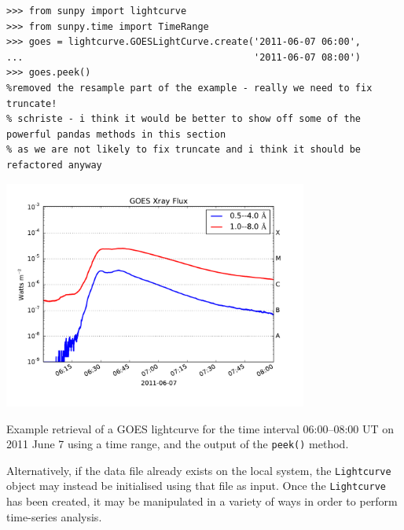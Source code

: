 \begin{listing}[H]
\begin{verbatim}
>>> from sunpy import lightcurve
>>> from sunpy.time import TimeRange
>>> goes = lightcurve.GOESLightCurve.create('2011-06-07 06:00',
...                                         '2011-06-07 08:00')
>>> goes.peek()
%removed the resample part of the example - really we need to fix truncate!
% schriste - i think it would be better to show off some of the powerful pandas methods in this section
% as we are not likely to fix truncate and i think it should be refactored anyway
\end{verbatim}
\begin{center}
\includegraphics[width=10cm]{goes_lightcurve.pdf}
\end{center}
\caption{Example retrieval of a GOES lightcurve for the time interval 
06:00--08:00 UT on 2011 June 7 using a time range, and the output of the 
\texttt{peek()} method.}
\label{code:goes_lc}
\end{listing}

Alternatively, if the data file already exists on the local system, the 
\texttt{Lightcurve} object may instead be initialised using that file as input.
Once the \texttt{Lightcurve} has been created, it may be manipulated in 
a variety of ways in order to perform time-series analysis.

